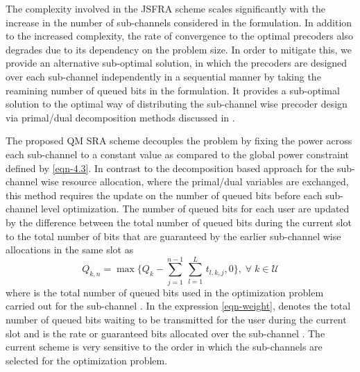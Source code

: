 
The complexity involved in the \ac{JSFRA} scheme scales significantly with the increase in the number of sub-channels considered in the formulation. In addition to the increased complexity, the rate of convergence to the optimal precoders also degrades due to its dependency on the problem size. In order to mitigate this, we provide an alternative sub-optimal solution, in which the precoders are designed over each sub-channel independently in a sequential manner by taking the reamining number of queued bits in the formulation. It provides a sub-optimal solution to the optimal way of distributing the sub-channel wise precoder design via primal/dual decomposition methods discussed in \cite{palomar2006tutorial,boyd2011distributed}.

The proposed \acf{QM} \ac{SRA} scheme decouples the problem by fixing the power across each sub-channel to a constant value as compared to the global power constraint defined by \eqref{eqn-4.3}. In contrast to the decomposition based approach for the sub-channel wise resource allocation, where the primal/dual variables are exchanged, this method requires the update on the number of queued bits before each sub-channel level optimization. The number of queued bits for each user are updated by the difference between the total number of queued bits during the current slot to the total number of bits that are guaranteed by the earlier sub-channel wise allocations in the same slot as
\begin{equation}
Q_{k,n} = \max{\Big \lbrace Q_k - \sum_{j = 1}^{n-1} \, \sum_{l = 1}^{L} \, t_{l,k,j} ,0 \Big \rbrace }, \; \forall \; k \in \mathcal{U}
\label{eqn-weight}
\end{equation}
where  is the total number of queued bits used in the optimization problem carried out for the sub-channel . In the expression \eqref{eqn-weight},  denotes the total number of queued bits waiting to be transmitted for the user  during the current slot and  is the rate or guaranteed bits allocated over the sub-channel . The current scheme is very sensitive to the order in which the sub-channels are selected for the optimization problem.

